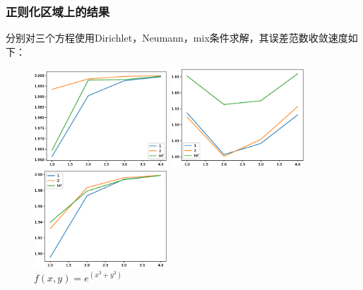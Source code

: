 \documentclass[12]{article}%
\begin{document}
\subsubsection{正则化区域上的结果}
分别对三个方程使用Dirichlet，Neumann，mix条件求解，其误差范数收敛速度如下：
\begin{figure}[H]
    \centering
    \begin{minipage}[t]{0.3\textwidth}
    \centering
    \includegraphics[width=5cm]{../pic/fun1_regu_error_norm.eps}
    \caption{$f(x,y)=e^(x^3+y^3)$}
    \end{minipage}
    \begin{minipage}[t]{0.3\textwidth}
    \centering
    \includegraphics[width=5cm]{../pic/fun2_regu_error_norm.eps}
    \caption{$f(x,y)=sin(3x+3y)$}
    \end{minipage}
    \begin{minipage}[t]{0.3\textwidth}
    \centering
    \includegraphics[width=5cm]{../pic/fun3_regu_error_norm.eps}
    \caption{$f(x,y)=e^(x^3+y^3)$}
    \end{minipage}
\end{figure}
\end{document}

